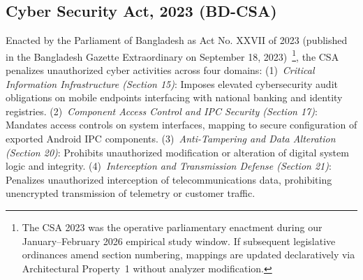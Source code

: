 \subsection{Cyber Security Act, 2023 (BD-CSA)}
\label{sec:statutory:csa}

Enacted by the Parliament of Bangladesh as Act No. XXVII of 2023 (published in the Bangladesh Gazette Extraordinary on September 18, 2023)~\cite{bd_csa_2026}\footnote{The CSA 2023 was the operative parliamentary enactment during our January--February 2026 empirical study window. If subsequent legislative ordinances amend section numbering, mappings are updated declaratively via Architectural Property~1 without analyzer modification.}, the CSA penalizes unauthorized cyber activities across four domains:
(1)~\textit{Critical Information Infrastructure (Section 15)}: Imposes elevated cybersecurity audit obligations on mobile endpoints interfacing with national banking and identity registries.
(2)~\textit{Component Access Control and IPC Security (Section 17)}: Mandates access controls on system interfaces, mapping to secure configuration of exported Android IPC components.
(3)~\textit{Anti-Tampering and Data Alteration (Section 20)}: Prohibits unauthorized modification or alteration of digital system logic and integrity.
(4)~\textit{Interception and Transmission Defense (Section 21)}: Penalizes unauthorized interception of telecommunications data, prohibiting unencrypted transmission of telemetry or customer traffic.
